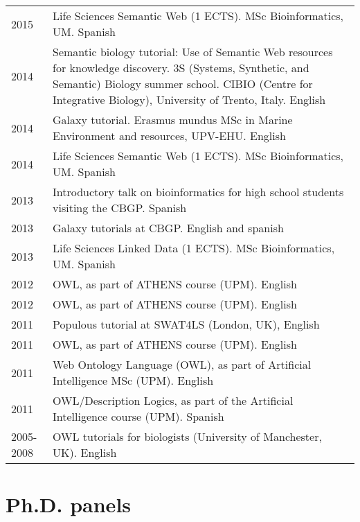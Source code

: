 \documentclass[11pt,fullpage]{article}
\begin{document}
\begin{longtable}{p{0.5in}|p{5.5in}}
2015 & Life Sciences Semantic Web (1 ECTS). MSc Bioinformatics, UM. Spanish \\
2014 & Semantic biology tutorial: Use of Semantic Web resources for knowledge discovery. 3S (Systems, Synthetic, and Semantic) Biology summer school. CIBIO (Centre for Integrative Biology), University of Trento, Italy. English \\
2014 & Galaxy tutorial. Erasmus mundus MSc in Marine Environment and resources, UPV-EHU. English \\
2014 & Life Sciences Semantic Web (1 ECTS). MSc Bioinformatics, UM. Spanish \\ %
2013 & Introductory talk on bioinformatics for high school students visiting the CBGP. Spanish \\
2013 & Galaxy tutorials at CBGP. English and spanish \\ %
2013 & Life Sciences Linked Data (1 ECTS). MSc Bioinformatics, UM. Spanish \\
2012 & OWL, as part of ATHENS course (UPM). English \\
2012 & OWL, as part of ATHENS course (UPM). English \\
2011 & Populous tutorial at SWAT4LS (London, UK), English \\
2011 & OWL, as part of ATHENS course (UPM). English \\
2011 & Web Ontology Language (OWL), as part of Artificial Intelligence MSc (UPM). English \\ %
2011 & OWL/Description Logics, as part of the Artificial Intelligence course (UPM). Spanish \\ %
2005-2008 & OWL tutorials for biologists (University of Manchester, UK). English \\

\end{longtable}

\section*{Ph.D. panels}
\end{document}
